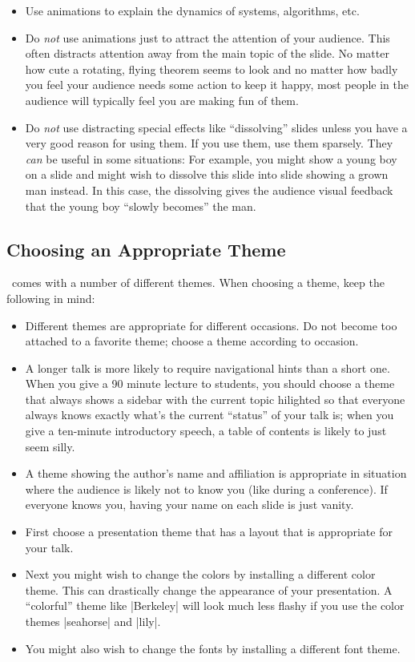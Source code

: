 \begin{itemize}
\item
  Use animations to explain the dynamics of systems, algorithms, etc.
\item
  Do \emph{not} use animations just to attract the attention of your
  audience. This often distracts attention away from the main topic of the
  slide. No matter how cute a rotating,
  flying theorem seems to look and no matter how badly you feel your
  audience needs some action to keep it happy, most people in the
  audience will typically feel you are making fun of them. 
\item
  Do \emph{not} use distracting special effects like ``dissolving''
  slides unless you have a very good reason for using them. If you use
  them, use them sparsely. 
  They \emph{can} be useful in some situations: For example, you might
  show a   young boy on a slide and might wish to dissolve this slide
  into   slide showing a grown man instead. In this case, the
  dissolving  gives the audience visual feedback that the young boy
  ``slowly becomes'' the man. 
\end{itemize}




\subsection{Choosing an Appropriate Theme}

\beamer\ comes with a number of different themes. When choosing a
theme, keep the following in mind:

\begin{itemize}
\item
  Different themes are appropriate for different occasions. Do not
  become too attached to a favorite theme; choose a 
  theme according to occasion.
\item
  A longer talk is more likely to require navigational hints
  than a short one. When you give a 90 minute lecture to students, you
  should choose a theme that always shows a sidebar with the current
  topic hilighted so that everyone always knows exactly what's the
  current ``status'' of your talk is; when you give a ten-minute
  introductory speech, a table of contents is likely to just seem
  silly.
\item
  A theme showing the author's name and affiliation is appropriate in
  situation where the audience is likely not to know you (like during
  a conference). If everyone knows you, having your name on each slide
  is just vanity. 
\item
  First choose a presentation theme that has a layout that is
  appropriate for your talk.
\item
  Next you might wish to change the colors by installing a different
  color theme. This can drastically change the appearance of your
  presentation. A ``colorful'' theme like |Berkeley| will look much
  less flashy if you use the color themes |seahorse| and |lily|. 
\item
  You might also wish to change the fonts by installing a different
  font theme.
\end{itemize}



